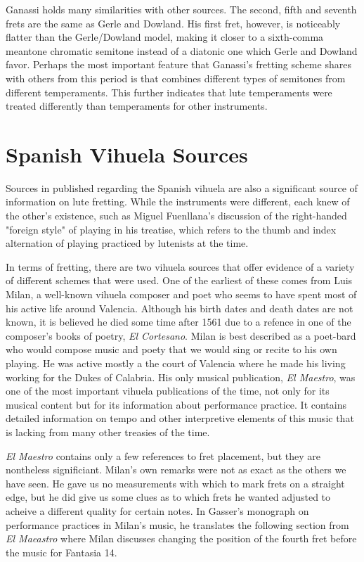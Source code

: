 Ganassi holds many similarities with other sources.  The second, fifth and
seventh frets are the same as Gerle and Dowland.  His first fret, however, is noticeably
flatter than the Gerle/Dowland model, making it closer to a sixth-comma meantone
chromatic semitone instead of a diatonic one which Gerle and Dowland favor. Perhaps
the most important feature that Ganassi's fretting scheme shares with others from this period
is that combines different types of
semitones from different temperaments.  This further indicates that lute temperaments were treated
differently than temperaments for other instruments.


\section{Spanish Vihuela Sources}

Sources in published regarding the Spanish vihuela are also a significant source of information
on lute fretting.  While the instruments were different, each knew of the other's existence,
such as Miguel Fuenllana's discussion of the right-handed "foreign style" of playing in his
treatise, which refers to the thumb and index alternation of playing practiced by lutenists
at the time.

In terms of fretting, there are two vihuela sources that offer evidence of a variety of
different schemes that were used. One of the
earliest of these comes from Luis Milan, a well-known vihuela composer and poet who seems
to have spent most of his
active life around Valencia.  Although his birth dates and death dates are not known, it
is believed he died some time after 1561 due to a refence in one of the composer's books of
poetry, \textit{El Cortesano}.\autocite[6]{LG:1}  Milan is best described as a poet-bard who would compose
music and poety that we would sing or recite to his own playing.  He was active mostly a the
court of Valencia where he made his living working for the Dukes of Calabria.
His only musical publication, \textit{El Maestro}, was one of the most important vihuela
publications of the time, not only for its musical content but for its information about
performance practice.  It contains detailed information on tempo and other interpretive
elements of this music that is lacking from many other treasies of the time.

\textit{El Maestro} contains only a few references to fret placement, but they are nontheless
significiant.  Milan's own remarks were not as exact as the others we have seen.  He gave us no
measurements with which to mark frets on a straight edge, but he did give us some clues as to
which frets he wanted adjusted to acheive a
different quality for certain notes.  In Gasser's monograph on performance practices in
Milan's music, he translates the following section from \textit{El Maeastro} where
Milan discusses changing the position of the fourth fret before the music for Fantasia 14.

